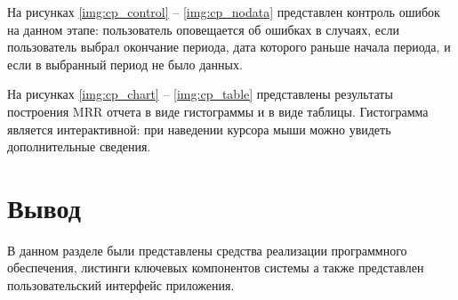 
На рисунках \ref{img:cp_control} -- \ref{img:cp_nodata} представлен контроль ошибок на данном этапе: пользователь оповещается об ошибках в случаях, если пользователь выбрал окончание периода, дата которого раньше начала периода, и если в выбранный период не было данных.



На рисунках \ref{img:cp_chart} -- \ref{img:cp_table} представлены результаты построения MRR отчета в виде гистограммы и в виде таблицы. Гистограмма является интерактивной: при наведении курсора мыши можно увидеть дополнительные сведения.



\section*{Вывод}

В данном разделе были представлены средства реализации программного обеспечения, листинги ключевых компонентов системы а также представлен пользовательский интерфейс приложения.

